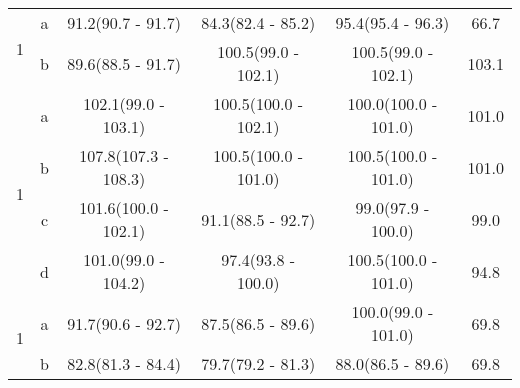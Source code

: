 \begin{table}[H]
\begin{tabular}{c|c|c|c|c|c}
\multirow{2}{*}{1} & a & 91.2(90.7 - 91.7) & 84.3(82.4 - 85.2) & 95.4(95.4 - 96.3) & 66.7\\ 
 & b & 89.6(88.5 - 91.7) & 100.5(99.0 - 102.1) & 100.5(99.0 - 102.1) & 103.1\\ 
\hline

\multirow{4}{*}{1} & a & 102.1(99.0 - 103.1) & 100.5(100.0 - 102.1) & 100.0(100.0 - 101.0) & 101.0\\ 
 & b & 107.8(107.3 - 108.3) & 100.5(100.0 - 101.0) & 100.5(100.0 - 101.0) & 101.0\\ 
 & c & 101.6(100.0 - 102.1) & 91.1(88.5 - 92.7) & 99.0(97.9 - 100.0) & 99.0\\ 
 & d & 101.0(99.0 - 104.2) & 97.4(93.8 - 100.0) & 100.5(100.0 - 101.0) & 94.8\\ 
\hline

\multirow{2}{*}{1} & a & 91.7(90.6 - 92.7) & 87.5(86.5 - 89.6) & 100.0(99.0 - 101.0) & 69.8\\ 
 & b & 82.8(81.3 - 84.4) & 79.7(79.2 - 81.3) & 88.0(86.5 - 89.6) & 69.8\\ 



		\hline\hline
		
	\end{tabular}
	\label{tab:resultsComplex}
\end{table}

\newpage

